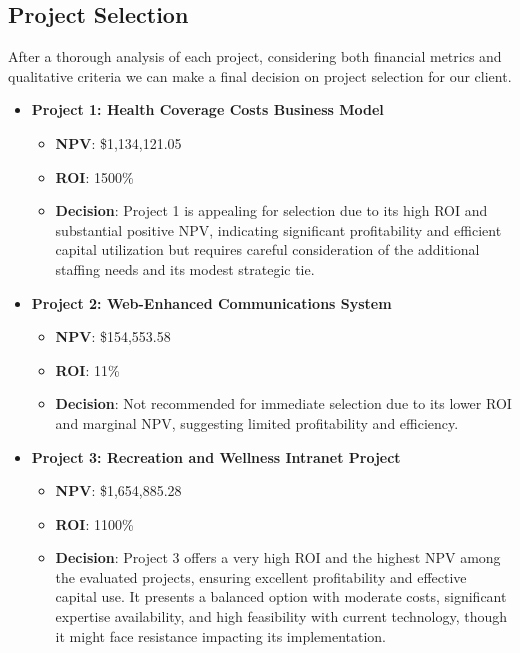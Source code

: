 \subsection{Project Selection}

After a thorough analysis of each project, considering both financial metrics and qualitative criteria we can make a final decision on project selection for our client.

\begin{itemize}
    \item \textbf{Project 1: Health Coverage Costs Business Model}
    \begin{itemize}
        \item \textbf{NPV}: \$1,134,121.05
        \item \textbf{ROI}: 1500\%
        \item \textbf{Decision}: Project 1 is appealing for selection due to its high ROI and substantial positive NPV, indicating significant profitability and efficient capital utilization but requires careful consideration of the additional staffing needs and its modest strategic tie.
    \end{itemize}

    \item \textbf{Project 2: Web-Enhanced Communications System}
    \begin{itemize}
        \item \textbf{NPV}: \$154,553.58
        \item \textbf{ROI}: 11\%
        \item \textbf{Decision}: Not recommended for immediate selection due to its lower ROI and marginal NPV, suggesting limited profitability and efficiency.
    \end{itemize}

    \item \textbf{Project 3: Recreation and Wellness Intranet Project}
    \begin{itemize}
        \item \textbf{NPV}: \$1,654,885.28
        \item \textbf{ROI}: 1100\%
        \item \textbf{Decision}: Project 3 offers a very high ROI and the highest NPV among the evaluated projects, ensuring excellent profitability and effective capital use. It presents a balanced option with moderate costs, significant expertise availability, and high feasibility with current technology, though it might face resistance impacting its implementation.
    \end{itemize}
\end{itemize}


